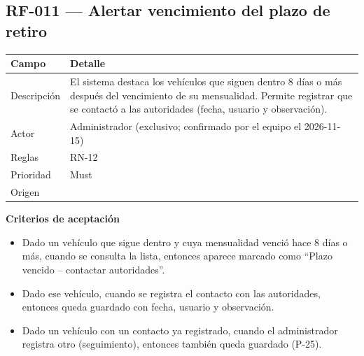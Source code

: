 \subsection{RF-011 — Alertar vencimiento del plazo de retiro}
\begin{longtable}{>{\raggedright\arraybackslash}p{3.2cm}>{\raggedright\arraybackslash}p{11.2cm}}
\toprule
\textbf{Campo} & \textbf{Detalle}\\
\midrule\endhead
Descripción & El sistema destaca los vehículos que siguen dentro 8 días o más después del vencimiento de su mensualidad. Permite registrar que se contactó a las autoridades (fecha, usuario y observación).\\
Actor & Administrador (exclusivo; confirmado por el equipo el 2026-11-15)\\
Reglas & RN-12\\
Prioridad & Must\\
Origen & [U]\\
\bottomrule
\end{longtable}

\textbf{Criterios de aceptación}
\begin{itemize}
  \item Dado un vehículo que sigue dentro y cuya mensualidad venció hace 8 días o más, cuando se consulta la lista, entonces aparece marcado como ``Plazo vencido – contactar autoridades''.
  \item Dado ese vehículo, cuando se registra el contacto con las autoridades, entonces queda guardado con fecha, usuario y observación.
  \item Dado un vehículo con un contacto ya registrado, cuando el administrador registra otro (seguimiento), entonces también queda guardado (P-25).
\end{itemize}


